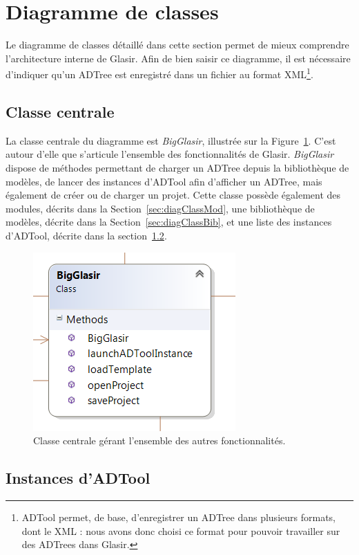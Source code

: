 \section{Diagramme de classes}
    \label{sec:diagClass}
    
    Le diagramme de classes détaillé dans cette section permet de mieux comprendre l'architecture interne de Glasir. Afin de bien saisir ce diagramme, il est nécessaire d'indiquer qu'un ADTree est enregistré dans un fichier au format XML\footnote{ADTool permet, de base, d'enregistrer un ADTree dans plusieurs formats, dont le XML : nous avons donc choisi ce format pour pouvoir travailler sur des ADTrees dans Glasir.}.
    
    \subsection{Classe centrale}
    	\label{sec:diagClassCentral}
    	La classe centrale du diagramme est \emph{BigGlasir}, illustrée sur la {\sc Figure}~\ref{fig:bigglasir}. C'est autour d'elle que s'articule l'ensemble des fonctionnalités de Glasir. \emph{BigGlasir} dispose de méthodes permettant de charger un ADTree depuis la bibliothèque de modèles, de lancer des instances d'ADTool afin d'afficher un ADTree, mais également de créer ou de charger un projet. Cette classe possède également des modules, décrits dans la {\sc Section}~{\ref{sec:diagClassMod}}, une bibliothèque de modèles, décrite dans la {\sc Section}~{\ref{sec:diagClassBib}}, et une liste des instances d'ADTool, décrite dans la {\sc section}~{\ref{sec:diagClassADT}}.
    	
    	\begin{figure}[H]
	        \centering
	        \includegraphics[height=0.3\textwidth]{figure/bigglasir.png}
	        \caption{Classe centrale gérant l'ensemble des autres fonctionnalités.}
	        \label{fig:bigglasir}
	    \end{figure}
    	
    \subsection{Instances d'ADTool}
    	\label{sec:diagClassADT}
    	
